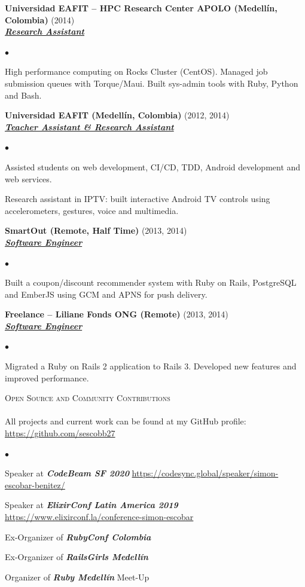 \documentclass[a4paper]{article}
\newcommand{\lineunder}{\vspace*{-8pt} \\ \hspace*{-18pt} \hrulefill \\}
\newcommand{\header}[1]{{\hspace*{-15pt}\vspace*{6pt}
  \textsc{#1}} \vspace*{-6pt} \lineunder}
\newcommand{\employer}[3]{{
  \textbf{#1} (#2)\\ \underline{\textbf{\emph{#3}}}\\ }}
\newenvironment{achievements}{\begin{list}{$\bullet$}{\topsep 0pt \itemsep
  -2pt}}{\vspace*{4pt}\end{list}}
\newcommand{\emphasys}[1]{\textbf{\emph{#1}}}
\begin{document}
  \employer{ Universidad EAFIT -- HPC Research Center APOLO (Medell\'in, Colombia)}{2014}{Research Assistant}
  \begin{achievements}
  \item High performance computing on Rocks Cluster (CentOS). Managed job submission queues with Torque/Maui. Built sys-admin tools with Ruby, Python and Bash.
  \end{achievements}

  \employer{ Universidad EAFIT (Medell\'in, Colombia)}{2012, 2014}{Teacher Assistant \& Research Assistant}
  \begin{achievements}
  \item Assisted students on web development, CI/CD, TDD, Android development and web services.
  \item Research assistant in IPTV: built interactive Android TV controls using accelerometers, gestures, voice and multimedia.
  \end{achievements}

  \employer{ SmartOut (Remote, Half Time)}{2013, 2014}{Software Engineer}
  \begin{achievements}
  \item Built a coupon/discount recommender system with Ruby on Rails, PostgreSQL and EmberJS using GCM and APNS for push delivery.
  \end{achievements}

  \employer{ Freelance -- Liliane Fonds ONG (Remote)}{2013, 2014}{Software Engineer}
  \begin{achievements}
  \item Migrated a Ruby on Rails 2 application to Rails 3. Developed new features and improved performance.
  \end{achievements}

  \header{Open Source and Community Contributions}
  All projects and current work can be found at my GitHub profile: \url{https://github.com/sescobb27}
  \begin{achievements}
  \item{Speaker at \emphasys{CodeBeam SF 2020} \url{https://codesync.global/speaker/simon-escobar-benitez/}}
  \item{Speaker at \emphasys{ElixirConf Latin America 2019} \url{https://www.elixirconf.la/conference-simon-escobar}}
  \item{Ex-Organizer of \emphasys{RubyConf Colombia}}
  \item{Ex-Organizer of \emphasys{RailsGirls Medell\'in}}
  \item{Organizer of \emphasys{Ruby Medell\'in} Meet-Up}
  \end{achievements}
\end{document}
